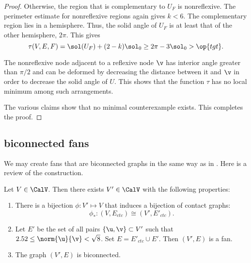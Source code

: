 \begin{proof}
  Otherwise, the region that is complementary
to $U_F$ is nonreflexive.  The perimeter estimate for nonreflexive regions again
gives $k<6$.  The complementary region lies in a hemisphere.  Thus,
the solid angle of $U_F$ is at least that of the other hemisphere,
$2\pi$.
%
This gives
\[
\tau(V,E,F) = \sol(U_F) + (2-k)\sol_0 \ge 2\pi - 3\sol_0 > \op{tgt}.
\]


The nonreflexive node adjacent to a reflexive node $\v$ has interior angle greater
than $\pi/2$ and can be deformed by decreasing the distance between it
and $\v$ in order to decrease the solid angle of $U$.  This shows that the
function $\tau$ has no local minimum among such arrangements.


The various claims show that no minimal counterexample exists.  This
completes the proof.
\end{proof}

\subsection{biconnected fans}


We may create  fans that are biconnected graphs in the same way as in
\cite{Hales:2006:DCG}.  Here is a review
of the construction.



\begin{lemma}\label{lemma:V'-bi} 
Let $V\in \CalV$.  Then there exists $V'\in \CalV$ with
  the following  properties:
\begin{enumerate}\wasitemize 
\item There is a bijection $\phi:V'\mapsto V$ that induces a bijection
  of contact graphs:
\[
\phi_*:(V,E_{ctc}) \cong (V',E'_{ctc}).
\]
\item Let $E'$ be the set of all pairs $\{\u,\v\}\subset V'$
  such that $2.52\le\norm{\u}{\v} <\sqrt8$.  Set $E =
  E'_{ctc}\cup E'$.  Then $(V',E)$ is a fan.
\item The graph $(V',E)$ is biconnected.
\end{enumerate}\wasitemize 
\end{lemma}

